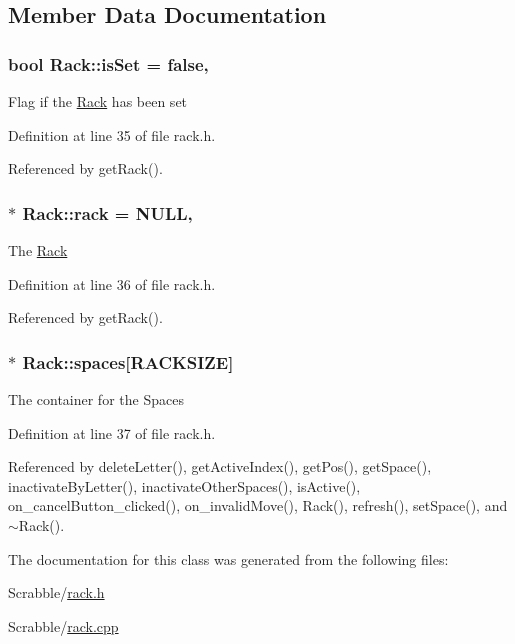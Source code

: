 \subsection{Member Data Documentation}
\hypertarget{class_rack_afcffaefc94d794ec29c52b5899f1d55f}{
\subsubsection[{is\-Set}]{\setlength{\rightskip}{0pt plus 5cm}bool Rack\-::is\-Set = false\hspace{0.3cm}{\ttfamily [static]}, {\ttfamily [private]}}}\label{class_rack_afcffaefc94d794ec29c52b5899f1d55f}
Flag if the \hyperlink{class_rack}{Rack} has been set 

Definition at line 35 of file rack.\-h.



Referenced by get\-Rack().

\hypertarget{class_rack_afac5cd813452f1191075fcbc4413ffb3}{
\subsubsection[{rack}]{ $\ast$ Rack\-::rack = N\-U\-L\-L\hspace{0.3cm}{\ttfamily [static]}, {\ttfamily [private]}}}\label{class_rack_afac5cd813452f1191075fcbc4413ffb3}
The \hyperlink{class_rack}{Rack} 

Definition at line 36 of file rack.\-h.



Referenced by get\-Rack().

\hypertarget{class_rack_a05c2ab5154aed4dde5306f7847ffad4b}{
\subsubsection[{spaces}]{$\ast$ Rack\-::spaces\mbox{[}{\bf R\-A\-C\-K\-S\-I\-Z\-E}\mbox{]}\hspace{0.3cm}{\ttfamily [private]}}}\label{class_rack_a05c2ab5154aed4dde5306f7847ffad4b}
The container for the Spaces 

Definition at line 37 of file rack.\-h.



Referenced by delete\-Letter(), get\-Active\-Index(), get\-Pos(), get\-Space(), inactivate\-By\-Letter(), inactivate\-Other\-Spaces(), is\-Active(), on\-\_\-cancel\-Button\-\_\-clicked(), on\-\_\-invalid\-Move(), Rack(), refresh(), set\-Space(), and $\sim$\-Rack().



The documentation for this class was generated from the following files\-:\begin{DoxyCompactItemize}
\item 
Scrabble/\hyperlink{rack_8h}{rack.\-h}\item 
Scrabble/\hyperlink{rack_8cpp}{rack.\-cpp}\end{DoxyCompactItemize}
